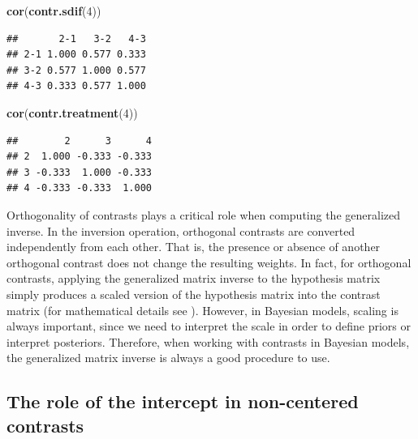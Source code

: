 \documentclass[12pt,]{krantz}
\newenvironment{Shaded}{\begin{snugshade}}{\end{snugshade}}
\newcommand{\KeywordTok}[1]{\textcolor[rgb]{0.13,0.29,0.53}{\textbf{#1}}}
\newcommand{\DecValTok}[1]{\textcolor[rgb]{0.00,0.00,0.81}{#1}}
\newcommand{\NormalTok}[1]{#1}
\theoremstyle{definition}
\theoremstyle{definition}
\theoremstyle{definition}
\theoremstyle{remark}
\begin{document}
\begin{Shaded}
\begin{Highlighting}[]
\KeywordTok{cor}\NormalTok{(}\KeywordTok{contr.sdif}\NormalTok{(}\DecValTok{4}\NormalTok{))}
\end{Highlighting}
\end{Shaded}

\begin{verbatim}
##       2-1   3-2   4-3
## 2-1 1.000 0.577 0.333
## 3-2 0.577 1.000 0.577
## 4-3 0.333 0.577 1.000
\end{verbatim}

\begin{Shaded}
\begin{Highlighting}[]
\KeywordTok{cor}\NormalTok{(}\KeywordTok{contr.treatment}\NormalTok{(}\DecValTok{4}\NormalTok{))}
\end{Highlighting}
\end{Shaded}

\begin{verbatim}
##        2      3      4
## 2  1.000 -0.333 -0.333
## 3 -0.333  1.000 -0.333
## 4 -0.333 -0.333  1.000
\end{verbatim}

Orthogonality of contrasts plays a critical role when computing the
generalized inverse. In the inversion operation, orthogonal contrasts
are converted independently from each other. That is, the presence or
absence of another orthogonal contrast does not change the resulting
weights. In fact, for orthogonal contrasts, applying the generalized
matrix inverse to the hypothesis matrix simply produces a scaled version
of the hypothesis matrix into the contrast matrix (for mathematical
details see \citet{schad2020capitalize}). However, in Bayesian models,
scaling is always important, since we need to interpret the scale in
order to define priors or interpret posteriors. Therefore, when working
with contrasts in Bayesian models, the generalized matrix inverse is
always a good procedure to use.

\subsection{The role of the intercept in non-centered
contrasts}\label{the-role-of-the-intercept-in-non-centered-contrasts}
\end{document}
